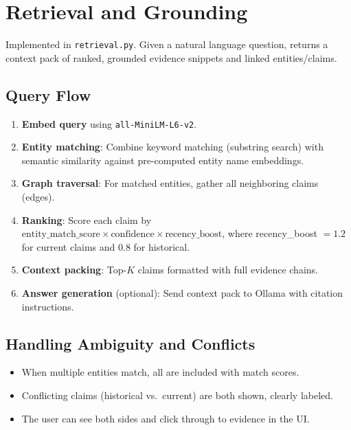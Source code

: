 \documentclass[11pt,a4paper]{article}
\begin{document}
\section{Retrieval and Grounding}

Implemented in \texttt{retrieval.py}. Given a natural language question, returns a context pack of ranked, grounded evidence snippets and linked entities/claims.

\subsection{Query Flow}
\begin{enumerate}[nosep]
    \item \textbf{Embed query} using \texttt{all-MiniLM-L6-v2}.
    \item \textbf{Entity matching}: Combine keyword matching (substring search) with semantic similarity against pre-computed entity name embeddings.
    \item \textbf{Graph traversal}: For matched entities, gather all neighboring claims (edges).
    \item \textbf{Ranking}: Score each claim by $\text{entity\_match\_score} \times \text{confidence} \times \text{recency\_boost}$, where recency\_boost $= 1.2$ for current claims and $0.8$ for historical.
    \item \textbf{Context packing}: Top-$K$ claims formatted with full evidence chains.
    \item \textbf{Answer generation} (optional): Send context pack to Ollama with citation instructions.
\end{enumerate}

\subsection{Handling Ambiguity and Conflicts}
\begin{itemize}[nosep]
    \item When multiple entities match, all are included with match scores.
    \item Conflicting claims (historical vs.\ current) are both shown, clearly labeled.
    \item The user can see both sides and click through to evidence in the UI.
\end{itemize}
\end{document}

